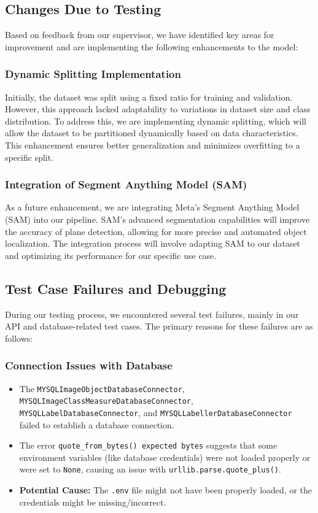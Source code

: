\documentclass[12pt, titlepage]{article}
\begin{document}
\subsection{Changes Due to Testing}
Based on feedback from our supervisor, we have identified key areas for improvement and are implementing the following enhancements to the model:

\subsubsection{Dynamic Splitting Implementation}
Initially, the dataset was split using a fixed ratio for training and validation. However, this approach lacked adaptability to variations in dataset size and class distribution. To address this, we are implementing dynamic splitting, which will allow the dataset to be partitioned dynamically based on data characteristics. This enhancement ensures better generalization and minimizes overfitting to a specific split.

\subsubsection{Integration of Segment Anything Model (SAM)}
As a future enhancement, we are integrating Meta’s Segment Anything Model (SAM) into our pipeline. SAM's advanced segmentation capabilities will improve the accuracy of plane detection, allowing for more precise and automated object localization. The integration process will involve adapting SAM to our dataset and optimizing its performance for our specific use case.

\subsection{Test Case Failures and Debugging}
During our testing process, we encountered several test failures, mainly in our API and database-related test cases. The primary reasons for these failures are as follows:

\subsubsection{Connection Issues with Database}
\begin{itemize}
    \item The \texttt{MYSQLImageObjectDatabaseConnector}, \texttt{MYSQLImageClassMeasureDatabaseConnector}, \texttt{MYSQLLabelDatabaseConnector}, and \texttt{MYSQLLabellerDatabaseConnector} failed to establish a database connection.
    \item The error \texttt{quote\_from\_bytes() expected bytes} suggests that some environment variables (like database credentials) were not loaded properly or were set to \texttt{None}, causing an issue with \texttt{urllib.parse.quote\_plus()}.
    \item \textbf{Potential Cause:} The \texttt{.env} file might not have been properly loaded, or the credentials might be missing/incorrect.
\end{itemize}
\end{document}
